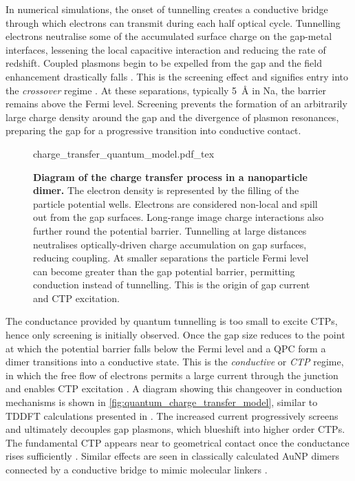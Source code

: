 \documentclass{article}
\begin{document}
In numerical simulations, the onset of tunnelling creates a conductive bridge through which electrons can transmit during each half optical cycle. Tunnelling electrons neutralise some of the accumulated surface charge on the gap-metal interfaces, lessening the local capacitive interaction and reducing the rate of redshift. Coupled plasmons begin to be expelled from the gap and the field enhancement drastically falls \cite{zuloaga2009, esteban2012}. This is the screening effect and signifies entry into the \emph{crossover} regime \cite{zuloaga2009}. At these separations, typically \SI{5}{\angstrom} in Na, the barrier remains above the Fermi level. Screening prevents the formation of an arbitrarily large charge density around the gap and the divergence of plasmon resonances, preparing the gap for a progressive transition into conductive contact.

\begin{figure}[bt]
\vspace{-5pt}
\def\svgwidth{0.9\textwidth}
\fontsize{10pt}{1em}\selectfont
{charge_transfer_quantum_model.pdf_tex}
\caption[Diagram of the charge transfer process in a nanoparticle dimer]{\textbf{Diagram of the charge transfer process in a nanoparticle dimer.} The electron density is represented by the filling of the particle potential wells. Electrons are considered non-local and spill out from the gap surfaces. Long-range image charge interactions also further round the potential barrier. Tunnelling at large distances neutralises optically-driven charge accumulation on gap surfaces, reducing coupling. At smaller separations the particle Fermi level can become greater than the gap potential barrier, permitting conduction instead of tunnelling. This is the origin of gap current and CTP excitation.}
\label{fig:quantum_charge_transfer_model}
\vspace{-15pt}
\end{figure}

The conductance provided by quantum tunnelling is too small to excite CTPs, hence only screening is initially observed. Once the gap size reduces to the point at which the potential barrier falls below the Fermi level and a QPC form a dimer transitions into a conductive state. This is the \emph{conductive} or \emph{CTP} regime, in which the free flow of electrons permits a large current through the junction and enables CTP excitation \cite{zuloaga2009}. A diagram showing this changeover in conduction mechanisms is shown in \autoref{fig:quantum_charge_transfer_model}, similar to TDDFT calculations presented in \cite{zuloaga2009}. The increased current progressively screens and ultimately decouples gap plasmons, which blueshift into higher order CTPs. The fundamental CTP appears near to geometrical contact once the conductance rises sufficiently \cite{esteban2012, scholl2013}. Similar effects are seen in classically calculated AuNP dimers connected by a conductive bridge to mimic molecular linkers \cite{perez2010, perez2011}.
\end{document}
